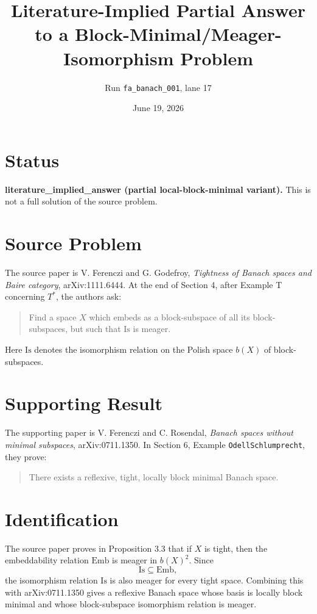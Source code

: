 \documentclass[11pt]{article}
\title{Literature-Implied Partial Answer to a Block-Minimal/Meager-Isomorphism Problem}
\author{Run \texttt{fa\_banach\_001}, lane 17}
\date{June 19, 2026}
\begin{document}
\maketitle

\section*{Status}

\textbf{literature\_implied\_answer (partial local-block-minimal variant).}
This is not a full solution of the source problem.

\section*{Source Problem}

The source paper is V. Ferenczi and G. Godefroy,
\emph{Tightness of Banach spaces and Baire category}, arXiv:1111.6444.
At the end of Section 4, after Example T concerning $T^*$, the authors ask:
\begin{quote}
Find a space $X$ which embeds as a block-subspace of all its block-subspaces,
but such that $\mathrm{Is}$ is meager.
\end{quote}
Here $\mathrm{Is}$ denotes the isomorphism relation on the Polish space $b(X)$
of block-subspaces.

\section*{Supporting Result}

The supporting paper is V. Ferenczi and C. Rosendal,
\emph{Banach spaces without minimal subspaces}, arXiv:0711.1350.  In Section
6, Example \texttt{OdellSchlumprecht}, they prove:
\begin{quote}
There exists a reflexive, tight, locally block minimal Banach space.
\end{quote}

\section*{Identification}

The source paper proves in Proposition 3.3 that if $X$ is tight, then the
embeddability relation $\mathrm{Emb}$ is meager in $b(X)^2$.  Since
\[
  \mathrm{Is}\subseteq \mathrm{Emb},
\]
the isomorphism relation $\mathrm{Is}$ is also meager for every tight space.
Combining this with arXiv:0711.1350 gives a reflexive Banach space whose basis
is locally block minimal and whose block-subspace isomorphism relation is
meager.
\end{document}
